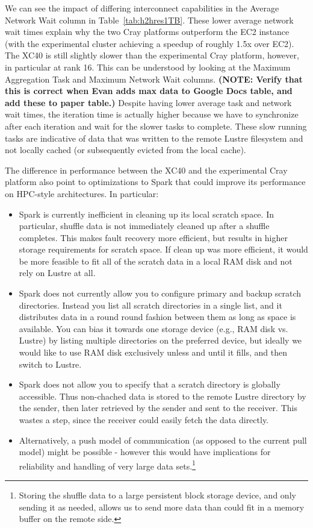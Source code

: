 We can see the impact of differing interconnect capabilities in the Average Network Wait column in Table~\ref{tab:h2hres1TB}.   These lower average network wait times explain why the two Cray platforms outperform the EC2 instance (with the experimental cluster achieving a speedup of roughly 1.5x over EC2).  The XC40 is still slightly slower than the experimental Cray platform, however, in particular at rank 16.  This can be understood by looking at the Maximum Aggregation Task and Maximum Network Wait columns.  \textbf{(NOTE: Verify that this is correct when Evan adds max data to Google Docs table, and add these to paper table.)}  Despite having lower average task and network wait times, the iteration time is actually higher because we have to synchronize after each iteration and wait for the slower tasks to complete.  These slow running tasks are indicative of data that was written to the remote Lustre filesystem and not locally cached (or subsequently evicted from the local cache).

The difference in performance between the XC40 and the experimental Cray platform also point to optimizations to Spark that could improve its performance on HPC-style architectures.  In particular:
\begin{itemize}
\item Spark is currently inefficient in cleaning up its local scratch space.  In particular, shuffle data is not immediately cleaned up after a shuffle completes.  This makes fault recovery more efficient, but results in higher storage requirements for scratch space.  If clean up was more efficient, it would be more feasible to fit all of the scratch data in a local RAM disk and not rely on Lustre at all.
\item Spark does not currently allow you to configure primary and backup scratch directories.  Instead you list all scratch directories in a single list, and it distributes data in a round round fashion between them as long as space is available.  You can bias it towards one storage device (e.g., RAM disk vs. Lustre) by listing multiple directories on the preferred device, but ideally we would like to use RAM disk exclusively unless and until it fills, and then switch to Lustre.
\item Spark does not allow you to specify that a scratch directory is globally accessible.  Thus non-chached data is stored to the remote Lustre directory by the sender, then later retrieved by the sender and sent to the receiver.  This wastes a step, since the receiver could easily fetch the data directly.
\item Alternatively, a push model of communication (as opposed to the current pull model) might be possible - however this would have implications for reliability and handling of very large data sets.\footnote{Storing the shuffle data to a large persistent block storage device, and only sending it as needed, allows us to send more data than could fit in a memory buffer on the remote side.}
\end{itemize}